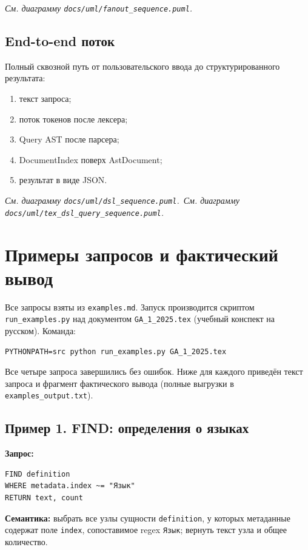 \documentclass[12pt,a4paper]{article}
\newcommand{\uml}[1]{\textit{См. диаграмму \texttt{docs/uml/#1}.}}
\newcommand{\code}[1]{\texttt{#1}}
\begin{document}
\uml{fanout\_sequence.puml}

\subsection{End-to-end поток}

Полный сквозной путь от пользовательского ввода до структурированного
результата:

\begin{enumerate}
  \item текст запроса;
  \item поток токенов после лексера;
  \item Query AST после парсера;
  \item DocumentIndex поверх AstDocument;
  \item результат в виде JSON.
\end{enumerate}

\uml{dsl\_sequence.puml}\ \uml{tex\_dsl\_query\_sequence.puml}

\section{Примеры запросов и фактический вывод}

Все запросы взяты из \code{examples.md}. Запуск производится скриптом
\code{run\_examples.py} над документом \code{GA\_1\_2025.tex} (учебный
конспект на русском). Команда:

\begin{Verbatim}[fontsize=\small,frame=single]
PYTHONPATH=src python run_examples.py GA_1_2025.tex
\end{Verbatim}

Все четыре запроса завершились без ошибок. Ниже для каждого приведён
текст запроса и фрагмент фактического вывода (полные выгрузки в
\code{examples\_output.txt}).

\subsection{Пример 1. FIND: определения о языках}

\textbf{Запрос:}
\begin{Verbatim}[fontsize=\small,frame=single,formatcom=\color{dslkw}]
FIND definition
WHERE metadata.index ~= "Язык"
RETURN text, count
\end{Verbatim}

\textbf{Семантика:} выбрать все узлы сущности \code{definition},
у которых метаданные содержат поле \code{index}, сопоставимое regex
\code{Язык}; вернуть текст узла и общее количество.
\end{document}

